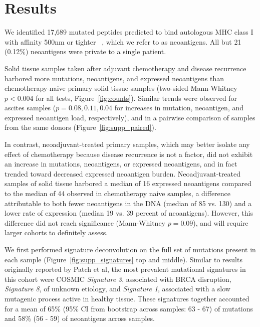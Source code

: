 \section*{Results}


We identified 17,689 mutated peptides predicted to bind autologous MHC class I with affinity 500nm or tighter ~\cite{Sette1994}, which we refer to as neoantigens. All but 21 (0.12\%) neoantigens were private to a single patient.

Solid tissue samples taken after adjuvant chemotherapy and disease recurrence harbored more mutations, neoantigens, and expressed neoantigens than chemotherapy-naive primary solid tissue samples (two-sided Mann-Whitney $p < 0.004$ for all tests, Figure~\ref{fig:counts}). Similar trends were observed for ascites samples ($p = 0.08, 0.11, 0.04$ for increases in mutation, neoantigen, and expressed neoantigen load, respectively), and in a pairwise comparison of samples from the same donors (Figure~\ref{fig:supp_paired}).

In contrast, neoadjuvant-treated primary samples, which may better isolate any effect of chemotherapy because disease recurrence is not a factor, did not exhibit an increase in mutations, neoantigens, or expressed neoantigens, and in fact trended toward decreased expressed neoantigen burden. Neoadjuvant-treated samples of solid tissue harbored a median of 16 expressed neoantigens compared to the median of 44 observed in chemotherapy naive samples, a difference attributable to both fewer neoantigens in the DNA (median of 85 vs. 130) and a lower rate of expression (median 19 vs. 39 percent of neoantigens). However, this difference did not reach significance (Mann-Whitney $p=0.09$), and will require larger cohorts to definitely assess.

We first performed signature deconvolution on the full set of mutations present in each sample (Figure~\ref{fig:supp_signatures} top and middle). Similar to results originally reported by Patch et al, the most prevalent mutational signatures in this cohort were COSMIC \textit{Signature 3}, associated with BRCA disruption, \textit{Signature 8}, of unknown etiology, and \textit{Signature 1}, associated with a slow mutagenic process active in healthy tissue. These signatures together accounted for a mean of 65\% (95\% CI from bootstrap across samples: 63 - 67) of mutations and 58\% (56 - 59) of neoantigens across samples.

